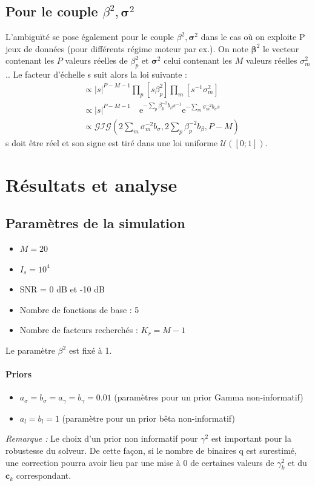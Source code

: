 \documentclass[ 12pt]{article}
\newcommand{\e}{\mathrm{e}}
\begin{document}
\subsection[]{Pour le couple $\beta^2, \bm{\sigma}^2$}
L’ambiguïté se pose également pour le couple $\beta^2, \bm{\sigma}^2$ dans le cas où on exploite P jeux de données (pour différents régime moteur par ex.).
On note $\bm{\beta}^2$ le vecteur contenant les $P$ valeurs réelles de $\beta^2_p$ et $\bm{\sigma}^2$ celui contenant les $M$ valeurs réelles $\sigma_m^2$.. Le facteur d'échelle s suit alors la loi suivante : 
\begin{align*}
	[s |\infty] &\propto |s|^{P-M-1} \prod_p [s \beta_p^2] \prod_m [s^{-1}\sigma_m^2]\\
	& \propto |s|^{P-M-1} \quad\e^{-\sum_p \beta_p^{-2} b_\beta s^{-1}} \e^{- \sum_m \sigma_m^{-2} b_\sigma s}\\
	& \propto \mathcal{GIG}(2 \sum_m \sigma^{-2}_m b_\sigma, 2 \sum_p \beta^{-2}_p b_\beta, P-M)
\end{align*}
s doit être réel et son signe est tiré dans une loi uniforme $\mathcal{U}([0;1])$.


\section{Résultats et analyse}
\subsection{Paramètres de la simulation}

\begin{itemize}
        \item $M=20$
        \item $I_s = 10^4$
        \item SNR = 0 dB et -10 dB
        \item Nombre de fonctions de base : 5
        \item Nombre de facteurs recherchés : $K_r= M-1$  
\end{itemize}
Le paramètre $\beta^2$ est fixé à 1.

\paragraph{Priors}
\begin{itemize}
        \item $a_\sigma = b_\sigma = a_\gamma = b_\gamma = 0.01$ (paramètres pour un prior Gamma non-informatif)
        \item $a_l = b_l = 1$ (paramètre pour un prior bêta non-informatif)
\end{itemize}
\textit{Remarque : }Le choix d'un prior non informatif pour $\gamma^2$ est important pour la robustesse du solveur. De cette façon, si le nombre de binaires q est surestimé, une correction pourra avoir lieu par une mise à 0 de certaines valeurs de $\gamma^2_k$ et du $\bm{c}_k$ correspondant.
\end{document}

